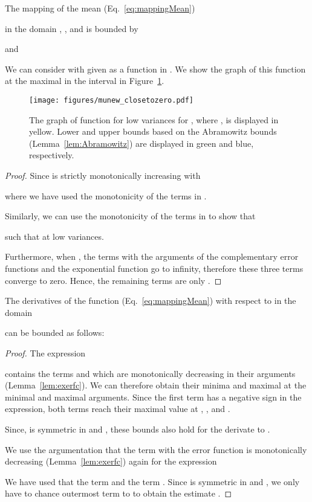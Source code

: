 \documentclass{article}
\begin{document}
\begin{lemma}
\label{lem:meanLowVar}
The mapping of the mean  (Eq.~\eqref{eq:mappingMean}) 

in the domain ,  ,
and  is bounded by  

and

\end{lemma}

We can consider  with given  as a function in . We show the graph of this function at the
maximal  in the interval  in Figure~\ref{fig:meanAtLowVar}.

\begin{figure}
  \centering
 \texttt{[image: figures/munew\_closetozero.pdf]}
 \caption[The graph of function  for low variances]{The graph of function  for low variances  for , where , is
 displayed in yellow. 
 Lower and upper bounds based on the Abramowitz bounds (Lemma~\ref{lem:Abramowitz}) are displayed in green and blue, respectively. 
 \label{fig:meanAtLowVar}}
\end{figure}



\begin{proof}
Since  is strictly monotonically increasing with  

where we have used the monotonicity of the terms in . 

Similarly, we can use the monotonicity of the terms in  to show that 


such that  at low variances.

Furthermore, when , the terms with the arguments of the complementary error functions  and the exponential function 
go to infinity, therefore these three terms converge to zero. Hence, the remaining terms are only .
\end{proof}



\begin{lemma}
\label{lem:muBounds}
The derivatives of the function  
(Eq.~\eqref{eq:mappingMean})
with respect to  in the domain 

can be bounded as follows:


\end{lemma}


\begin{proof}
The expression

contains the terms 
and 
which are monotonically decreasing in their arguments (Lemma~\ref{lem:exerfc}). We can therefore obtain their
minima and maximal at the minimal and maximal arguments. Since the first term has a negative sign in the expression, both terms
reach their maximal value at , , and . 


Since,  is symmetric in  and , these bounds also hold for the derivate to .

We use the argumentation that the term with the error function is monotonically decreasing (Lemma~\ref{lem:exerfc})
again for the expression


We have used that the term 
and the term .
Since  is symmetric in  and , we only have to chance outermost
term  to   to 
obtain the estimate .


\end{proof}
\end{document}
